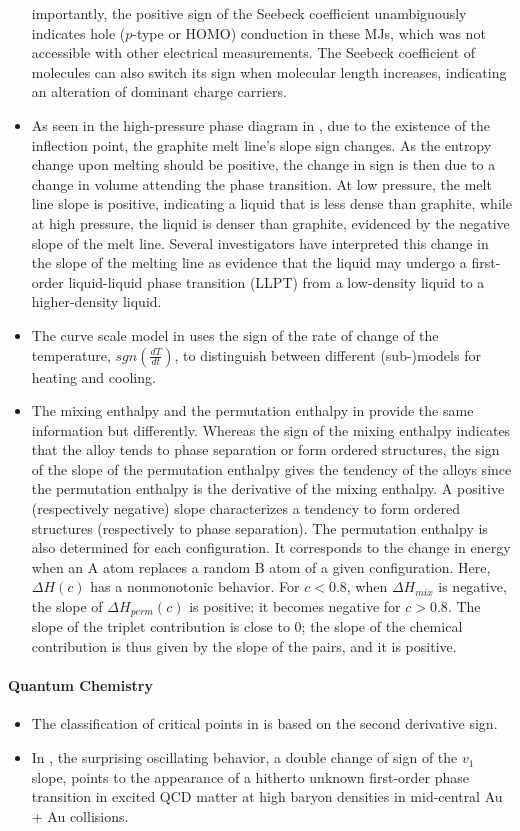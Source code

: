 \documentclass[11pt]{book}
\begin{document}
\begin{itemize}
importantly, the positive sign of the Seebeck coefficient unambiguously
indicates hole ($p$-type or HOMO) conduction in these MJs, which
was not accessible with other electrical measurements. The Seebeck
coefficient of molecules can also switch its sign when molecular length
increases, indicating an alteration of dominant charge carriers.
\item As seen in the high-pressure phase diagram in \cite{hull2020liquid},
due to the existence of the inflection point, the graphite melt line's
slope sign changes. As the entropy change upon melting should be positive,
the change in sign is then due to a change in volume attending the
phase transition. At low pressure, the melt line slope is positive,
indicating a liquid that is less dense than graphite, while at high
pressure, the liquid is denser than graphite, evidenced by the negative
slope of the melt line. Several investigators have interpreted this
change in the slope of the melting line as evidence that the liquid
may undergo a first-order liquid-liquid phase transition (LLPT) from
a low-density liquid to a higher-density liquid.
\item The curve scale model in \cite{barz2021paraffins}
uses the sign of the rate of change of the temperature, $sgn\left(\frac{dT}{dt}\right)$,
to distinguish between different (sub-)models for heating and cooling.
\item The mixing enthalpy and the permutation enthalpy in \cite{berthier2021effective}
provide the same information but differently. Whereas the sign of
the mixing enthalpy indicates that the alloy tends to phase separation
or form ordered structures, the sign of the slope of the permutation
enthalpy gives the tendency of the alloys since the permutation enthalpy
is the derivative of the mixing enthalpy. A positive (respectively
negative) slope characterizes a tendency to form ordered structures
(respectively to phase separation). The permutation enthalpy is also
determined for each configuration. It corresponds to the change in
energy when an A atom replaces a random B atom of a given configuration.
Here, $\Delta H\left(c\right)$ has a nonmonotonic behavior. For $c<0.8$,
when $\Delta H_{mix}$ is negative, the slope of $\Delta H_{perm}\left(c\right)$
is positive; it becomes negative for $c>0.8$. The slope of the triplet
contribution is close to $0$; the slope of the chemical contribution
is thus given by the slope of the pairs, and it is positive.
\end{itemize}

\paragraph{Quantum Chemistry}
\begin{itemize}
\item The classification of critical points in \cite{de2019quantifying}
is based on the second derivative sign.
\item In \cite{nara2019sensitivity},
the surprising oscillating behavior, a double change of sign of the
$v_{1}$ slope, points to the appearance of a hitherto unknown first-order
phase transition in excited QCD matter at high baryon densities in
mid-central Au + Au collisions.
\end{itemize}
\end{document}
